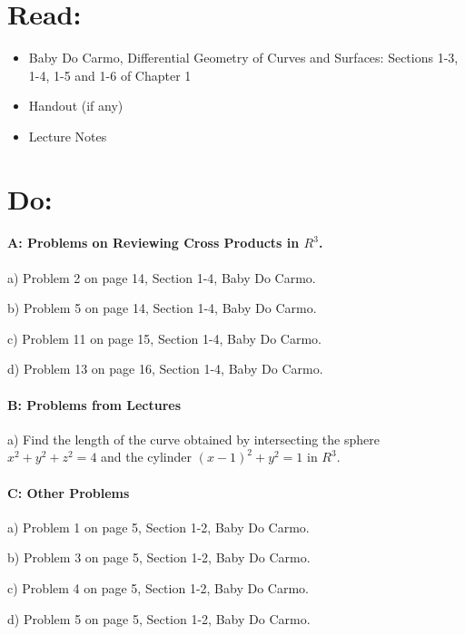 \documentclass[12pt]{article}
\title{}
\author{\LARGE {HMC\quad Math 142 \quad Fall 2026} 
\\ {Prof. Gu}  
\\ {\LARGE Problem Set 2}}
\date{Start this assignment before Sunday night!}
\begin{document}
\maketitle

\section*{ Read: }

\begin{itemize}
	\item{Baby Do Carmo, Differential Geometry
		      of Curves and Surfaces:
		      Sections 1-3, 1-4, 1-5 and 1-6 of Chapter 1}
	\item{Handout (if any)}
	\item{Lecture Notes}
\end{itemize}

\section*{ Do: }
\paragraph{A: Problems on Reviewing Cross Products in $R^3$.}
\begin{itemize}
	{\item a) Problem 2 on page 14, Section 1-4, Baby Do Carmo.}
	{\item b) Problem 5 on page 14, Section 1-4, Baby Do Carmo.}
	{\item c) Problem 11 on page 15, Section 1-4, Baby Do Carmo.}
	{\item d) Problem 13 on page 16, Section 1-4, Baby Do Carmo.}

\end{itemize}

\medskip
\paragraph{B: Problems from Lectures}

\begin{itemize}
	{\item a) Find the length of the curve obtained by
		intersecting the sphere $x^2 + y^2 + z^2 = 4 $ and the cylinder
		$(x-1)^2 + y^2 = 1$ in $R^3$. }
\end{itemize}

\paragraph{C: Other Problems}
\begin{itemize}
	{\item a) Problem 1 on page 5, Section 1-2, Baby Do Carmo.}
	{\item b) Problem 3 on page 5, Section 1-2, Baby Do Carmo.}
	{\item c) Problem 4 on page 5, Section 1-2, Baby Do Carmo.}
	{\item d) Problem 5 on page 5, Section 1-2, Baby Do Carmo.}
\end{itemize}

\end{document}
